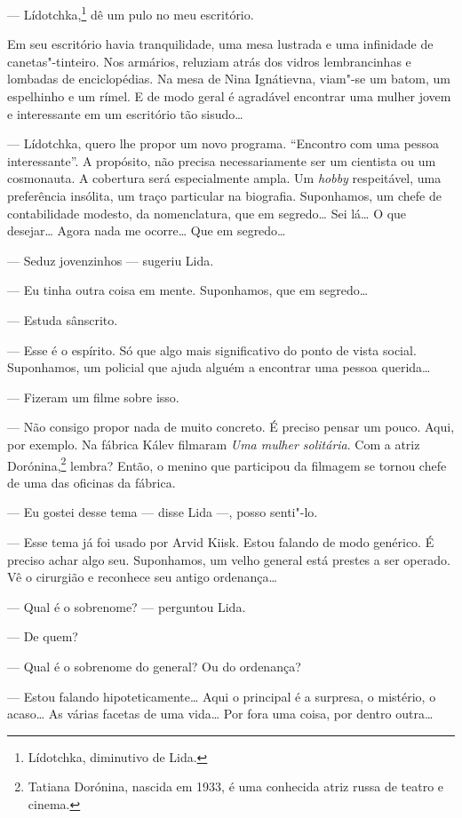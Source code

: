 --- Lídotchka,\footnote{Lídotchka, diminutivo de Lida.} dê um pulo no
meu escritório.

Em seu escritório havia tranquilidade, uma mesa lustrada e uma
infinidade de canetas"-tinteiro. Nos armários, reluziam atrás dos vidros
lembrancinhas e lombadas de enciclopédias. Na mesa de Nina Ignátievna,
viam"-se um batom, um espelhinho e um rímel. E de modo geral é agradável
encontrar uma mulher jovem e interessante em um escritório tão sisudo\ldots{}

--- Lídotchka, quero lhe propor um novo programa. ``Encontro com uma
pessoa interessante''. A propósito, não precisa necessariamente ser um
cientista ou um cosmonauta. A cobertura será especialmente ampla. Um
\emph{hobby} respeitável, uma preferência insólita, um traço particular
na biografia. Suponhamos, um chefe de contabilidade modesto, da
nomenclatura, que em segredo\ldots{} Sei lá\ldots{} O que desejar\ldots{} Agora nada me
ocorre\ldots{} Que em segredo\ldots{}

--- Seduz jovenzinhos --- sugeriu Lida.

--- Eu tinha outra coisa em mente. Suponhamos, que em segredo\ldots{}

--- Estuda sânscrito.

--- Esse é o espírito. Só que algo mais significativo do ponto de vista
social. Suponhamos, um policial que ajuda alguém a encontrar uma pessoa
querida\ldots{}

--- Fizeram um filme sobre isso.

--- Não consigo propor nada de muito concreto. É preciso pensar um
pouco. Aqui, por exemplo. Na fábrica Kálev filmaram \emph{Uma mulher
solitária}. Com a atriz Dorónina,\footnote{Tatiana Dorónina, nascida em
  1933, é uma conhecida atriz russa de teatro e cinema.} lembra? Então,
o menino que participou da filmagem se tornou chefe de uma das oficinas
da fábrica.

--- Eu gostei desse tema --- disse Lida ---, posso senti"-lo.

--- Esse tema já foi usado por Arvid Kiisk. Estou falando de modo
genérico. É preciso achar algo seu. Suponhamos, um velho general está
prestes a ser operado. Vê o cirurgião e reconhece seu antigo
ordenança\ldots{}

--- Qual é o sobrenome? --- perguntou Lida.

--- De quem?

--- Qual é o sobrenome do general? Ou do ordenança?

--- Estou falando hipoteticamente\ldots{} Aqui o principal é a surpresa, o
mistério, o acaso\ldots{} As várias facetas de uma vida\ldots{} Por fora uma
coisa, por dentro outra\ldots{}

